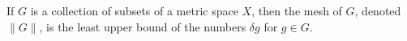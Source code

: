 If $G$ is a collection of subsets of a metric space $X$, then the mesh of $G$, denoted $\|G\|$, is the least upper bound of the numbers $\delta g$ for $g \in G$.
